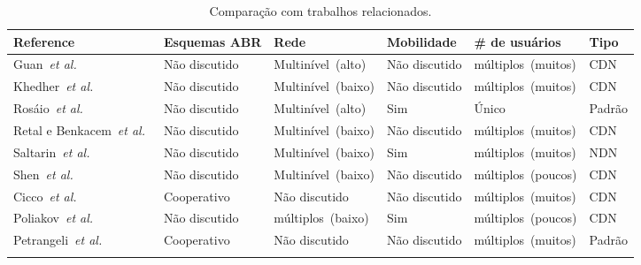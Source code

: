\begin{table}[htb]
  \caption{Comparação com trabalhos relacionados.}
  \label{tab:comparison}
  \centering
  \scriptsize
  \begin{tabular}{p{2.8cm}p{2cm}p{2.3cm}p{2.2cm}p{2.6cm}p{1.5cm}}
    \toprule
    \textbf{Reference} &
    \textbf{Esquemas ABR} &
    \textbf{Rede} &
    \textbf{Mobilidade} &
    \textbf{\# de \newline usuários} &
    \textbf{Tipo} \\
    \midrule

    Guan~\textit{et al.}~\cite{guan:2019:CLC} &
    Não discutido & Multinível~(alto) & Não discutido & múltiplos~(muitos) & CDN \\
    \addlinespace
	\addlinespace

    Khedher~\textit{et al.}~\cite{khedherComNet2017,khedherLCN2017} &
    Não discutido & Multinível~(baixo) & Não discutido & múltiplos~(muitos) & CDN \\
    \addlinespace
    \addlinespace

    Rosáio~\textit{et al.}~\cite{rosarioSENSORS2018} &
    Não discutido & Multinível~(alto) & Sim & Único & Padrão \\
    \addlinespace
	\addlinespace
	
    Retal e Benkacem~\textit{et al.}~\cite{retalICC2017,talebComMag17} &
    Não discutido & Multinível~(baixo) & Não discutido & múltiplos~(muitos) & CDN \\
    \addlinespace
	\addlinespace
	
    Saltarin~\textit{et al.}~\cite{saltarinTrans2017} &
    Não discutido & Multinível~(baixo) & Sim & múltiplos~(muitos) & NDN \\
    \addlinespace
	\addlinespace

    Shen~\textit{et al.}~\cite{shenIWQoS19} &
    Não discutido & Multinível~(baixo) & Não discutido & múltiplos~(poucos) & CDN \\
    \addlinespace
	\addlinespace
	
    Cicco~\textit{et al.}~\cite{cicco:2019:QRA} &
    Cooperativo & Não discutido & Não discutido & múltiplos~(muitos) & CDN \\
    \addlinespace
	\addlinespace
	
    Poliakov~\textit{et al.}~\cite{poliakovPHD2018} &
    Não discutido & múltiplos~(baixo) & Sim & múltiplos~(poucos) & CDN \\
    \addlinespace
	\addlinespace

    Petrangeli~\textit{et al.}~\cite{petrangeli2019IM} &
    Cooperativo & Não discutido & Não discutido & múltiplos~(muitos) & Padrão \\
    \addlinespace
	\addlinespace
	

\end{tabular}
\end{table}
